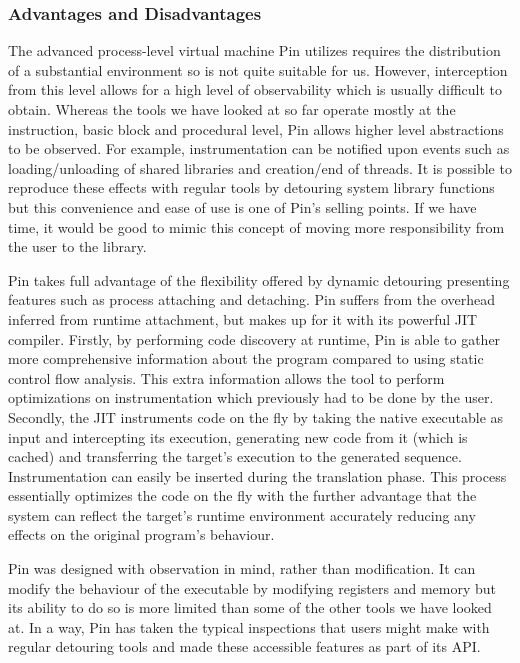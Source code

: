 \subsubsection{Advantages and Disadvantages}

The advanced process-level virtual machine Pin utilizes requires the distribution of a substantial environment so is not quite suitable for us. However, interception from this level allows for a high level of observability which is usually difficult to obtain. Whereas the tools we have looked at so far operate mostly at the instruction, basic block and procedural level, Pin allows higher level abstractions to be observed. For example, instrumentation can be notified upon events such as loading/unloading of shared libraries and creation/end of threads. It is possible to reproduce these effects with regular tools by detouring system library functions but this convenience and ease of use is one of Pin's selling points. If we have time, it would be good to mimic this concept of moving more responsibility from the user to the library.

Pin takes full advantage of the flexibility offered by dynamic detouring presenting features such as process attaching and detaching. Pin suffers from the overhead inferred from runtime attachment, but makes up for it with its powerful JIT compiler. Firstly, by performing code discovery at runtime, Pin is able to gather more comprehensive information about the program compared to using static control flow analysis. This extra information allows the tool to perform optimizations on instrumentation which previously had to be done by the user. Secondly, the JIT instruments code on the fly by taking the native executable as input and intercepting its execution, generating new code from it (which is cached) and transferring the target's execution to the generated sequence. Instrumentation can easily be inserted during the translation phase. This process essentially optimizes the code on the fly with the further advantage that the system can reflect the target's runtime environment accurately reducing any effects on the original program's behaviour.

Pin was designed with observation in mind, rather than modification. It can modify the behaviour of the executable by modifying registers and memory but its ability to do so is more limited than some of the other tools we have looked at. In a way, Pin has taken the typical inspections that users might make with regular detouring tools and made these accessible features as part of its API.


